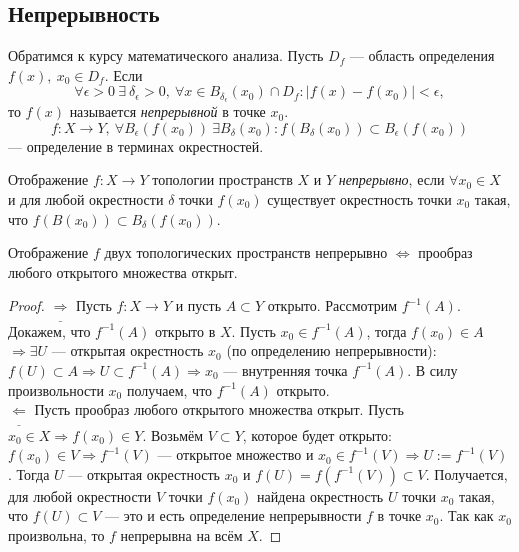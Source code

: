 \subsection{Непрерывность}
\begin{definition} Обратимся к курсу математического анализа.
    Пусть $D_f$ — область определения $f(x),\ x_0\in D_f$. Если 
    \[\forall \epsilon>0\ \exists\ \delta_{\epsilon}>0,\ \forall x\in B_{\delta_{\epsilon}}(x_0)\cap D_f: |f(x)-f(x_0)|<\epsilon,\] 
    то $f(x)$ называется \textit{непрерывной} в точке $x_0$. \\
    $$f: X \to Y, \ \forall B_{\epsilon}(f(x_0)) \ \exists B_{\delta}(x_0): f(B_{\delta}(x_0)) \subset B_{\epsilon}(f(x_0))$$ — определение в терминах окрестностей.
\end{definition}

\begin{definition}
    Отображение $f: X \to Y$ топологии пространств $X$ и $Y$ \textit{непрерывно}, если $\forall x_0 \in X$ и для любой окрестности $\delta$ точки $f(x_0)$ существует окрестность точки $x_0$ такая, что $f(B(x_0)) \subset B_{\delta} (f(x_0))$.
\end{definition}

\begin{statement}
    Отображение $f$ двух топологических пространств непрерывно $\Longleftrightarrow$ прообраз любого открытого множества открыт.
\end{statement}
\begin{proof}
    $\underline{\Longrightarrow}$ Пусть $f: X \to Y$ и пусть $A \subset Y$ открыто. Рассмотрим $f^{-1}(A)$. Докажем, что $f^{-1}(A)$ открыто в $X$. Пусть $x_0 \in f^{-1}(A)$, тогда $f(x_0) \in A$ $\Longrightarrow \exists U$ — открытая окрестность $x_0$ (по определению непрерывности): $f(U) \subset A \Longrightarrow U \subset f^{-1}(A) \Longrightarrow x_0$ — внутренняя точка $f^{-1}(A)$. В силу произвольности $x_0$ получаем, что $f^{-1}(A)$ открыто. \\
    $\underline{\Longleftarrow}$ Пусть прообраз любого открытого множества открыт. Пусть $x_0 \in X \Longrightarrow f(x_0) \in Y$. Возьмём $V \subset Y$, которое будет открыто: $f(x_0) \in V \Longrightarrow f^{-1}(V)$ — открытое множество и $x_0 \in f^{-1}(V) \Longrightarrow U := f^{-1}(V)$. Тогда $U$  — открытая окрестность $x_0$ и $f(U) = f(f^{-1}(V)) \subset V$. Получается, для любой окрестности $V$ точки $f(x_0)$ найдена окрестность $U$ точки $x_0$ такая, что $f(U) \subset V$ — это и есть определение непрерывности $f$ в точке $x_0$. Так как $x_0$ произвольна, то $f$ непрерывна на всём $X$.
\end{proof}

